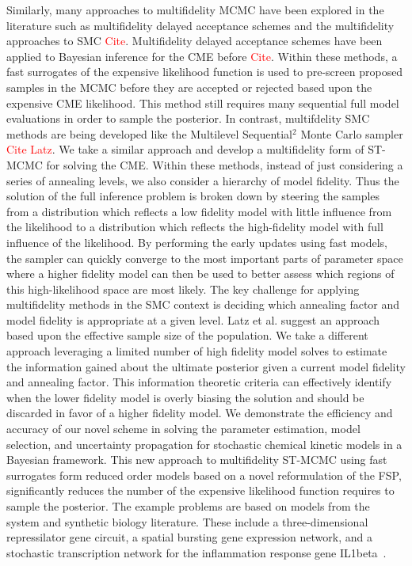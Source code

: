 \documentclass[1p]{article}
\begin{document}
Similarly, many approaches to multifidelity MCMC have been explored in the literature such as multifidelity delayed acceptance schemes and the multifidelity approaches to SMC \textcolor{red}{Cite}. Multifidelity delayed acceptance schemes have been applied to Bayesian inference for the CME before  \textcolor{red}{Cite}. Within these methods, a fast surrogates of the expensive likelihood function is used to pre-screen proposed samples in the MCMC before they are accepted or rejected based upon the expensive CME likelihood. This method still requires many sequential full model evaluations in order to sample the posterior. In contrast, multifdelity SMC methods are being developed like the Multilevel Sequential$^2$ Monte Carlo sampler \textcolor{red}{Cite Latz}. We take a similar approach and develop a multifidelity form of ST-MCMC for solving the CME.   Within these methods, instead of just considering a series of annealing levels, we also consider a hierarchy of model fidelity.  Thus the solution of the full inference problem is broken down by steering the samples from a distribution which reflects a low fidelity model with little influence from the likelihood to a distribution which reflects the high-fidelity model with full influence of the likelihood. By performing the early updates using fast models, the sampler can quickly converge to the most important parts of parameter space where a higher fidelity model can then be used to better assess which regions of this high-likelihood space are most likely. The key challenge for applying multifidelity methods in the SMC context is deciding which annealing factor and model fidelity is appropriate at a given level. Latz et al. suggest an approach based upon the effective sample size of the population. We take a different approach leveraging a limited number of high fidelity model solves to estimate the information gained about the ultimate posterior given a current model fidelity and annealing factor. This information theoretic criteria can effectively identify when the lower fidelity model is overly biasing the solution and should be discarded in favor of a higher fidelity model.
%
We demonstrate the efficiency and accuracy of our novel scheme in solving the parameter estimation, model selection, and uncertainty propagation for stochastic chemical kinetic models in a Bayesian framework. This new approach to multifidelity ST-MCMC using fast surrogates form reduced order models based on a novel reformulation of the FSP, significantly reduces the number of the expensive likelihood function requires to sample the posterior. The example problems are based on models from the system and synthetic biology literature. These include a three-dimensional repressilator gene circuit, a spatial bursting gene expression network, and a stochastic transcription network for the inflammation response gene IL1beta~\cite{Kalb2019}.
\end{document}
